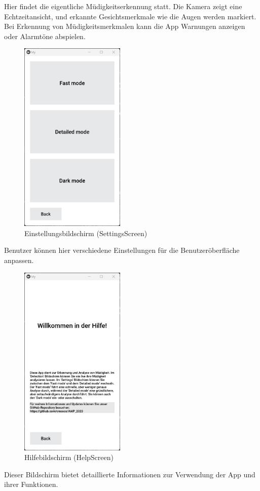 		Hier findet die eigentliche Müdigkeitserkennung statt. Die Kamera zeigt eine Echtzeitansicht, und erkannte Gesichtsmerkmale wie die Augen werden markiert. Bei Erkennung von Müdigkeitsmerkmalen kann die App Warnungen anzeigen oder Alarmtöne abspielen.
		\begin{figure}[h]
			\centering
			\includegraphics[width=5cm]{images/settingscreen.png} %
			\caption{Einstellungsbildschirm (SettingsScreen)}
			\label{fig:settingscreen}
		\end{figure}
		Benutzer können hier verschiedene Einstellungen für die Benutzeröberfläche anpassen.
		\begin{figure}[h]
			\centering
			\includegraphics[width=5cm]{images/helpscreen.png} %
			\caption{Hilfebildschirm (HelpScreen)}
			\label{fig:helpscreen}
		\end{figure}
		Dieser Bildschirm bietet detaillierte Informationen zur Verwendung der App und ihrer Funktionen.